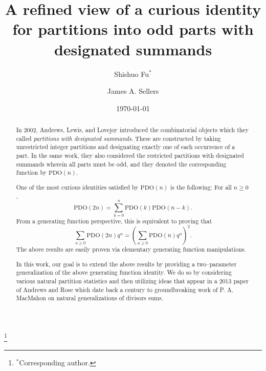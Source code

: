 \documentclass[11pt,reqno]{amsart}
\numberwithin{equation}{section}
\theoremstyle{plain}
\theoremstyle{definition}
\theoremstyle{named}
\def\PDO{\mathrm{PDO}}
\begin{document}
\title[A PDO refinement]{A refined view of a curious identity for partitions into odd parts with designated summands}


\author[S. Fu]{Shishuo Fu$^{\ast}$}
\address[Shishuo Fu]{College of Mathematics and Statistics, Chongqing University \& Key Laboratory of Nonlinear Analysis and its Applications (Chongqing University), Ministry of Education, Chongqing 401331, P.R. China}
\thanks{$^{\ast}$Corresponding author.}

\author[J. A. Sellers]{James A. Sellers}
\address[James A. Sellers]{Department of Mathematics and Statistics, University of Minnesota Duluth, Duluth, MN 55812, USA}

\date{\today}

\begin{abstract}

In 2002, Andrews, Lewis, and Lovejoy introduced the combinatorial objects which they called {\it partitions with designated summands}.  These are constructed by taking unrestricted integer partitions and designating exactly one of each occurrence of a part.  In the same work, they also considered the restricted partitions with designated summands wherein all parts must be odd, and they denoted the corresponding function by $\PDO(n)$.  

One of the most curious identities satisfied by $\PDO(n)$ is the following:  
 For all $n\geq 0$,
\begin{equation*}
\PDO(2n)=\sum_{k=0}^{n}\PDO(k)\PDO(n-k).
\end{equation*}
From a generating function perspective, this is equivalent to proving that 
\begin{equation*}
\sum_{n\geq 0} \PDO(2n)q^n = \left( \sum_{n\geq 0} \PDO(n)q^n \right)^2. 
\end{equation*}
The above results are easily proven via elementary generating function manipulations.  

In this work, our goal is to extend the above results by providing a two--parameter generalization of the above generating function identity.  We do so by considering various natural partition statistics and then utilizing ideas that appear in a 2013 paper of Andrews and Rose which date back a century to groundbreaking work of P. A. MacMahon on natural generalizations of divisors sums.  

\end{abstract}

\end{document}
